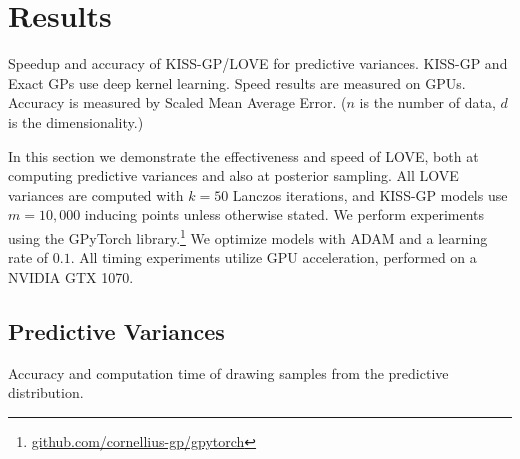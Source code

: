 \section{Results}
\label{sec:results}
\begin{table}[t!]
  \caption{
    Speedup and accuracy of KISS-GP/LOVE{} for predictive variances.
    KISS-GP and Exact GPs use deep kernel learning.
    Speed results are measured on GPUs.
    Accuracy is measured by Scaled Mean Average Error.
    ($n$ is the number of data, $d$ is the dimensionality.)
    \label{tab:large_dataset_results}
  }
  \vspace{0.5ex}
  \centering
  \resizebox{\textwidth}{!}{%
    
  }
\end{table}

In this section we demonstrate the effectiveness and speed of LOVE{}, both at computing predictive variances and also at posterior sampling.
All LOVE{} variances are computed with $k=50$ Lanczos iterations,
and KISS-GP models use $m\!=\!10,\!000$ inducing points unless otherwise stated.
We perform experiments using the GPyTorch library.\footnote{
  \url{github.com/cornellius-gp/gpytorch}}
We optimize models with ADAM \cite{kingma2014adam} and a learning rate of $0.1$.
All timing experiments utilize GPU acceleration, performed on a NVIDIA GTX 1070.

\subsection{Predictive Variances}
\label{sec:results_variances}

\begin{table}[t!]
  \caption{
    Accuracy and computation time of drawing samples from the predictive distribution.
    \label{tab:sampling_results}
  }
  \vspace{0.5ex}
  \centering
  \resizebox{\textwidth}{!}{%
    
  }
\end{table}

